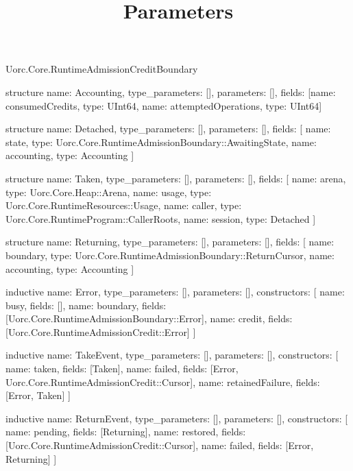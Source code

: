 \begin{lexlean}{Uorc.Core.RuntimeAdmissionCreditBoundary}
\title{Parameters}
\begin{semanticmodule}
structure{
  name: Accounting,
  type_parameters: [],
  parameters: [],
  fields: [{name: consumedCredits, type: UInt64}, {name: attemptedOperations, type: UInt64}]
}

structure{
  name: Detached,
  type_parameters: [],
  parameters: [],
  fields: [
    {name: state, type: Uorc.Core.RuntimeAdmissionBoundary::AwaitingState},
    {name: accounting, type: Accounting}
  ]
}

structure{
  name: Taken,
  type_parameters: [],
  parameters: [],
  fields: [
    {name: arena, type: Uorc.Core.Heap::Arena},
    {name: usage, type: Uorc.Core.RuntimeResources::Usage},
    {name: caller, type: Uorc.Core.RuntimeProgram::CallerRoots},
    {name: session, type: Detached}
  ]
}

structure{
  name: Returning,
  type_parameters: [],
  parameters: [],
  fields: [
    {name: boundary, type: Uorc.Core.RuntimeAdmissionBoundary::ReturnCursor},
    {name: accounting, type: Accounting}
  ]
}

inductive{
  name: Error,
  type_parameters: [],
  parameters: [],
  constructors: [
    {name: busy, fields: []},
    {name: boundary, fields: [Uorc.Core.RuntimeAdmissionBoundary::Error]},
    {name: credit, fields: [Uorc.Core.RuntimeAdmissionCredit::Error]}
  ]
}

inductive{
  name: TakeEvent,
  type_parameters: [],
  parameters: [],
  constructors: [
    {name: taken, fields: [Taken]},
    {name: failed, fields: [Error, Uorc.Core.RuntimeAdmissionCredit::Cursor]},
    {name: retainedFailure, fields: [Error, Taken]}
  ]
}

inductive{
  name: ReturnEvent,
  type_parameters: [],
  parameters: [],
  constructors: [
    {name: pending, fields: [Returning]},
    {name: restored, fields: [Uorc.Core.RuntimeAdmissionCredit::Cursor]},
    {name: failed, fields: [Error, Returning]}
  ]
}


\end{semanticmodule}
\end{lexlean}
